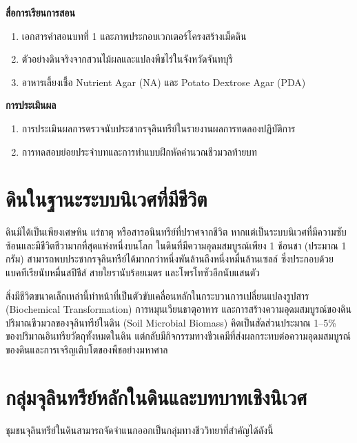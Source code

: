 \noindent\textbf{สื่อการเรียนการสอน}
\begin{enumerate}
    \item เอกสารคำสอนบทที่ 1 และภาพประกอบเวกเตอร์โครงสร้างเม็ดดิน
    \item ตัวอย่างดินจริงจากสวนไม้ผลและแปลงพืชไร่ในจังหวัดจันทบุรี
    \item อาหารเลี้ยงเชื้อ Nutrient Agar (NA) และ Potato Dextrose Agar (PDA)
\end{enumerate}

\noindent\textbf{การประเมินผล}
\begin{enumerate}
    \item การประเมินผลการตรวจนับประชากรจุลินทรีย์ในรายงานผลการทดลองปฏิบัติการ
    \item การทดสอบย่อยประจำบทและการทำแบบฝึกหัดคำนวณชีวมวลท้ายบท
\end{enumerate}

\newpage


\section{ดินในฐานะระบบนิเวศที่มีชีวิต}

ดินมิได้เป็นเพียงเศษหิน แร่ธาตุ หรือสารอนินทรีย์ที่ปราศจากชีวิต หากแต่เป็นระบบนิเวศที่มีความซับซ้อนและมีชีวิตชีวามากที่สุดแห่งหนึ่งบนโลก ในดินที่มีความอุดมสมบูรณ์เพียง 1 ช้อนชา (ประมาณ 1 กรัม) สามารถพบประชากรจุลินทรีย์ได้มากกว่าหนึ่งพันล้านถึงหนึ่งหมื่นล้านเซลล์ ซึ่งประกอบด้วยแบคทีเรียนับหมื่นสปีชีส์ สายใยรานับร้อยเมตร และโพรโทซัวอีกนับแสนตัว

สิ่งมีชีวิตขนาดเล็กเหล่านี้ทำหน้าที่เป็นตัวขับเคลื่อนหลักในกระบวนการเปลี่ยนแปลงรูปสาร (Biochemical Transformation) การหมุนเวียนธาตุอาหาร และการสร้างความอุดมสมบูรณ์ของดิน ปริมาณชีวมวลของจุลินทรีย์ในดิน (Soil Microbial Biomass) คิดเป็นสัดส่วนประมาณ 1--5\% ของปริมาณอินทรียวัตถุทั้งหมดในดิน แต่กลับมีกิจกรรมทางชีวเคมีที่ส่งผลกระทบต่อความอุดมสมบูรณ์ของดินและการเจริญเติบโตของพืชอย่างมหาศาล

\section{กลุ่มจุลินทรีย์หลักในดินและบทบาทเชิงนิเวศ}

ชุมชนจุลินทรีย์ในดินสามารถจัดจำแนกออกเป็นกลุ่มทางชีววิทยาที่สำคัญได้ดังนี้

